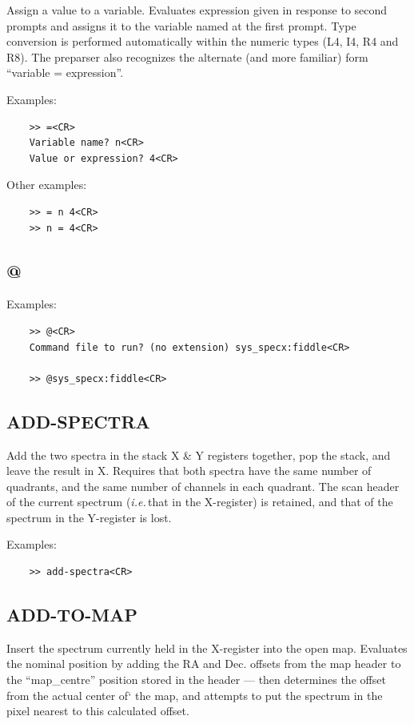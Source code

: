 \documentclass[11pt,twoside]{report}
\newcommand{\ie}{{\it i.e.\,}}
\begin{document}
Assign a value to a variable. Evaluates expression given in response to
second prompts and assigns it to the variable named at the first prompt.
Type conversion is performed automatically within the numeric types (L4, I4,
R4 and R8). The preparser also recognizes the alternate (and more familiar)
form ``variable = expression''.

Examples:
\begin{verbatim}
    >> =<CR>
    Variable name? n<CR>
    Value or expression? 4<CR>
\end{verbatim}
Other examples:
\begin{verbatim}
    >> = n 4<CR>
    >> n = 4<CR>
\end{verbatim}

\subsection{@}  
Examples:
\begin{verbatim}
    >> @<CR>
    Command file to run? (no extension) sys_specx:fiddle<CR>

    >> @sys_specx:fiddle<CR>
\end{verbatim}

\subsection{ADD-SPECTRA} 

Add the two spectra in the stack X \& Y registers together, pop the stack,
and leave the result in X. Requires that both spectra have the same number
of quadrants, and the same number of channels in each quadrant. The scan
header of the current spectrum (\ie that in the X-register) is retained,
and that of the spectrum in the Y-register is lost.

Examples:
\begin{verbatim}
    >> add-spectra<CR>
\end{verbatim}

\subsection{ADD-TO-MAP} 

Insert the spectrum currently held in the X-register into the open map.
Evaluates the nominal position by adding the RA and Dec. offsets from the
map header to the ``map\_centre'' position stored in the header --- then
determines the offset from the actual center of` the map, and attempts to
put the spectrum in the pixel nearest to this calculated offset.
\end{document}
